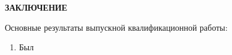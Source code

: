 \newpage
\begin{center}
  \textbf{\large ЗАКЛЮЧЕНИЕ}
\end{center}

Основные результаты выпускной квалификационной работы:
\begin{enumerate}

\item Был

\end{enumerate}
